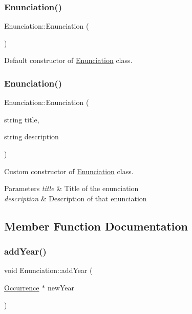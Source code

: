 \subsubsection{\texorpdfstring{Enunciation()}{Enunciation()}\hspace{0.1cm}{\footnotesize\ttfamily [1/2]}}
{\footnotesize\ttfamily Enunciation\+::\+Enunciation (\begin{DoxyParamCaption}{ }\end{DoxyParamCaption})}



Default constructor of \hyperlink{class_enunciation}{Enunciation} class. 

\mbox{\label{class_enunciation_a954fa90c85714409ab224e6f405c26e4}} 
\subsubsection{\texorpdfstring{Enunciation()}{Enunciation()}\hspace{0.1cm}{\footnotesize\ttfamily [2/2]}}
{\footnotesize\ttfamily Enunciation\+::\+Enunciation (\begin{DoxyParamCaption}\item[{string}]{title,  }\item[{string}]{description }\end{DoxyParamCaption})}



Custom constructor of \hyperlink{class_enunciation}{Enunciation} class. 


\begin{DoxyParams}{Parameters}
{\em title} & Title of the enunciation \\
\hline
{\em description} & Description of that enunciation \\
\hline
\end{DoxyParams}


\subsection{Member Function Documentation}
\mbox{\label{class_enunciation_a86a3547dd604f7050a5e12b473ba6eef}} 
\subsubsection{\texorpdfstring{add\+Year()}{addYear()}}
{\footnotesize\ttfamily void Enunciation\+::add\+Year (\begin{DoxyParamCaption}\item[{\hyperlink{class_occurrence}{Occurrence} $\ast$}]{new\+Year }\end{DoxyParamCaption})}



